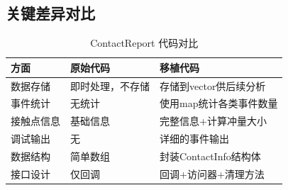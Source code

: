 \subsection{关键差异对比}
\begin{table}[h]
\centering
\caption{ContactReport 代码对比}
\begin{tabular}{|l|p{5cm}|p{5cm}|}
\hline
\textbf{方面} & \textbf{原始代码} & \textbf{移植代码} \\ \hline
数据存储 & 即时处理，不存储 & 存储到vector供后续分析 \\ \hline
事件统计 & 无统计 & 使用map统计各类事件数量 \\ \hline
接触点信息 & 基础信息 & 完整信息+计算冲量大小 \\ \hline
调试输出 & 无 & 详细的事件输出 \\ \hline
数据结构 & 简单数组 & 封装ContactInfo结构体 \\ \hline
接口设计 & 仅回调 & 回调+访问器+清理方法 \\ \hline
\end{tabular}
\end{table}

